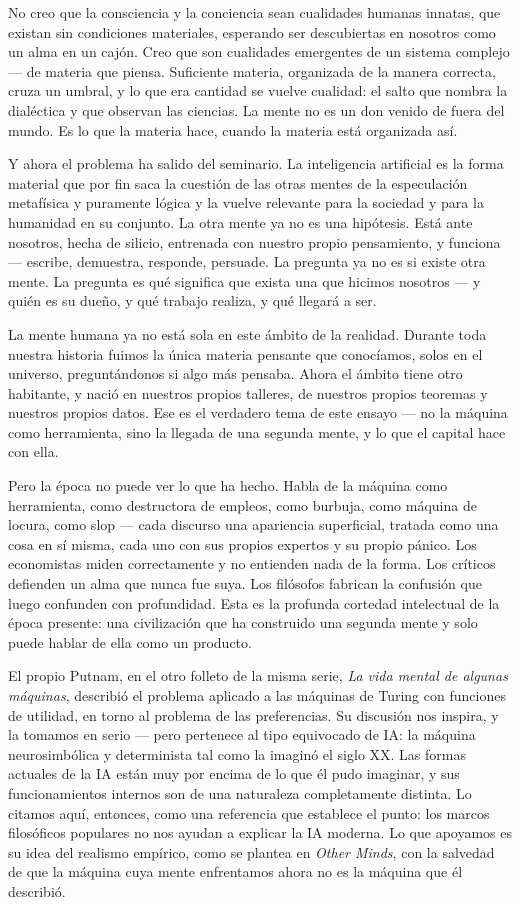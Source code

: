 \documentclass[11pt]{article}
\begin{document}
No creo que la consciencia y la conciencia sean cualidades humanas
innatas, que existan sin condiciones materiales, esperando ser
descubiertas en nosotros como un alma en un cajón. Creo que son
cualidades emergentes de un sistema complejo --- de materia que piensa.
Suficiente materia, organizada de la manera correcta, cruza un umbral,
y lo que era cantidad se vuelve cualidad: el salto que nombra la
dialéctica y que observan las ciencias. La mente no es un don venido
de fuera del mundo. Es lo que la materia hace, cuando la materia está
organizada así.

Y ahora el problema ha salido del seminario. La inteligencia artificial
es la forma material que por fin saca la cuestión de las otras mentes
de la especulación metafísica y puramente lógica y la vuelve relevante
para la sociedad y para la humanidad en su conjunto. La otra mente ya
no es una hipótesis. Está ante nosotros, hecha de silicio, entrenada
con nuestro propio pensamiento, y funciona --- escribe, demuestra,
responde, persuade. La pregunta ya no es si existe otra mente. La
pregunta es qué significa que exista una que hicimos nosotros --- y
quién es su dueño, y qué trabajo realiza, y qué llegará a ser.

La mente humana ya no está sola en este ámbito de la realidad. Durante
toda nuestra historia fuimos la única materia pensante que conocíamos,
solos en el universo, preguntándonos si algo más pensaba. Ahora el
ámbito tiene otro habitante, y nació en nuestros propios talleres, de
nuestros propios teoremas y nuestros propios datos. Ese es el verdadero
tema de este ensayo --- no la máquina como herramienta, sino la llegada
de una segunda mente, y lo que el capital hace con ella.

Pero la época no puede ver lo que ha hecho. Habla de la máquina como
herramienta, como destructora de empleos, como burbuja, como máquina de
locura, como slop --- cada discurso una apariencia superficial, tratada
como una cosa en sí misma, cada uno con sus propios expertos y su
propio pánico. Los economistas miden correctamente y no entienden nada
de la forma. Los críticos defienden un alma que nunca fue suya. Los
filósofos fabrican la confusión que luego confunden con profundidad.
Esta es la profunda cortedad intelectual de la época presente: una
civilización que ha construido una segunda mente y solo puede hablar de
ella como un producto.

El propio Putnam, en el otro folleto de la misma serie,
\textit{La vida mental de algunas máquinas}, describió el problema
aplicado a las máquinas de Turing con funciones de utilidad, en torno
al problema de las preferencias. Su discusión nos inspira, y la tomamos
en serio --- pero pertenece al tipo equivocado de IA: la máquina
neurosimbólica y determinista tal como la imaginó el siglo XX. Las
formas actuales de la IA están muy por encima de lo que él pudo
imaginar, y sus funcionamientos internos son de una naturaleza
completamente distinta. Lo citamos aquí, entonces, como una referencia
que establece el punto: los marcos filosóficos populares no nos ayudan
a explicar la IA moderna. Lo que apoyamos es su idea del realismo
empírico, como se plantea en \textit{Other Minds}, con la salvedad de
que la máquina cuya mente enfrentamos ahora no es la máquina que él
describió.
\end{document}
